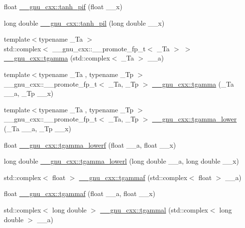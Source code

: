 \begin{DoxyCompactItemize}
float \hyperlink{group__gnu__math__spec__func_gab6cbfb582127f997ad9a198903d08889}{\+\_\+\+\_\+gnu\+\_\+cxx\+::tanh\+\_\+pif} (float \+\_\+\+\_\+x)
\item 
long double \hyperlink{group__gnu__math__spec__func_ga4bc71ee5cf3df2ba35e6504027e5c6c6}{\+\_\+\+\_\+gnu\+\_\+cxx\+::tanh\+\_\+pil} (long double \+\_\+\+\_\+x)
\item 
{\footnotesize template$<$typename \+\_\+\+Ta $>$ }\\std\+::complex$<$ \+\_\+\+\_\+gnu\+\_\+cxx\+::\+\_\+\+\_\+promote\+\_\+fp\+\_\+t$<$ \+\_\+\+Ta $>$ $>$ \hyperlink{group__gnu__math__spec__func_ga6133351c7602e917fd08d62d897e57d0}{\+\_\+\+\_\+gnu\+\_\+cxx\+::tgamma} (std\+::complex$<$ \+\_\+\+Ta $>$ \+\_\+\+\_\+a)
\item 
{\footnotesize template$<$typename \+\_\+\+Ta , typename \+\_\+\+Tp $>$ }\\\+\_\+\+\_\+gnu\+\_\+cxx\+::\+\_\+\+\_\+promote\+\_\+fp\+\_\+t$<$ \+\_\+\+Ta, \+\_\+\+Tp $>$ \hyperlink{group__gnu__math__spec__func_ga5e8ff98ee1e04d90965f2a8b2f639a18}{\+\_\+\+\_\+gnu\+\_\+cxx\+::tgamma} (\+\_\+\+Ta \+\_\+\+\_\+a, \+\_\+\+Tp \+\_\+\+\_\+x)
\item 
{\footnotesize template$<$typename \+\_\+\+Ta , typename \+\_\+\+Tp $>$ }\\\+\_\+\+\_\+gnu\+\_\+cxx\+::\+\_\+\+\_\+promote\+\_\+fp\+\_\+t$<$ \+\_\+\+Ta, \+\_\+\+Tp $>$ \hyperlink{group__gnu__math__spec__func_ga973fba718e906a5179d954c56b991c8d}{\+\_\+\+\_\+gnu\+\_\+cxx\+::tgamma\+\_\+lower} (\+\_\+\+Ta \+\_\+\+\_\+a, \+\_\+\+Tp \+\_\+\+\_\+x)
\item 
float \hyperlink{group__gnu__math__spec__func_ga8f2aabeaa29d21b19c43972efb26798c}{\+\_\+\+\_\+gnu\+\_\+cxx\+::tgamma\+\_\+lowerf} (float \+\_\+\+\_\+a, float \+\_\+\+\_\+x)
\item 
long double \hyperlink{group__gnu__math__spec__func_gad057fe49a5bf95b1550f5f0a6e60bb19}{\+\_\+\+\_\+gnu\+\_\+cxx\+::tgamma\+\_\+lowerl} (long double \+\_\+\+\_\+a, long double \+\_\+\+\_\+x)
\item 
std\+::complex$<$ float $>$ \hyperlink{group__gnu__math__spec__func_gaf548b80db1501cbc067de1564e721972}{\+\_\+\+\_\+gnu\+\_\+cxx\+::tgammaf} (std\+::complex$<$ float $>$ \+\_\+\+\_\+a)
\item 
float \hyperlink{group__gnu__math__spec__func_ga942773871e9c21a50cf13ec160e7e8d9}{\+\_\+\+\_\+gnu\+\_\+cxx\+::tgammaf} (float \+\_\+\+\_\+a, float \+\_\+\+\_\+x)
\item 
std\+::complex$<$ long double $>$ \hyperlink{group__gnu__math__spec__func_ga8d53515dba9c860fd6058a4b75aaff58}{\+\_\+\+\_\+gnu\+\_\+cxx\+::tgammal} (std\+::complex$<$ long double $>$ \+\_\+\+\_\+a)

\end{DoxyCompactItemize}
